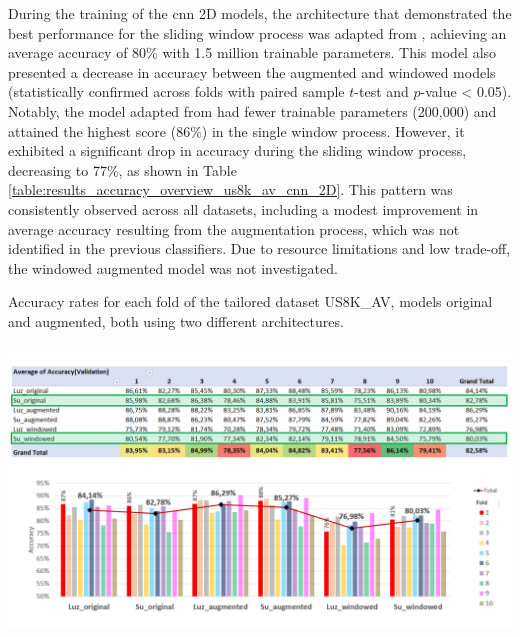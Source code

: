 
During the training of the \gls{cnn} 2D models, the architecture that demonstrated the best performance for the sliding window process was adapted from \textcite{Su2020}, achieving an average accuracy of 80\% with 1.5 million trainable parameters. This model also presented a decrease in accuracy between the augmented and windowed models (statistically confirmed across folds with paired sample $t$-test and $p$-value < 0.05). Notably, the model adapted from \textcite{Luz2021} had fewer trainable parameters (200,000) and attained the highest score (86\%) in the single window process. However, it exhibited a significant drop in accuracy during the sliding window process, decreasing to 77\%, as shown in Table \ref{table:results_accuracy_overview_us8k_av_cnn_2D}. This pattern was consistently observed across all datasets, including a modest improvement in average accuracy resulting from the augmentation process, which was not identified in the previous classifiers. Due to resource limitations and low trade-off, the windowed augmented model was not investigated.

\begin{table}[ht!]
    \caption[Accuracy rates for each fold of the tailored dataset US8K\_AV.]{Accuracy rates for each fold of the tailored dataset US8K\_AV, models original and augmented, both using two different architectures.}
    \label{table:results_accuracy_overview_us8k_av_cnn_2D}
     \raggedright
    \includegraphics[width=1\textwidth]{resources/images/060-results/Results_classification_overview_us8k_av_cnn2d.png}
\end{table}


